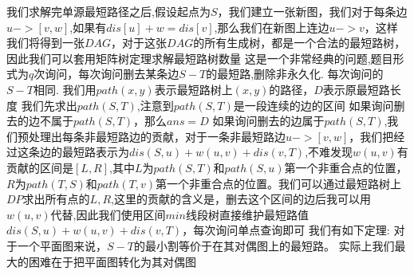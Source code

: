 {}我们求解完单源最短路径之后,假设起点为$ S $，我们建立一张新图，我们对于每条边$ u->[v,w] $,如果有$ dis[u]+w=dis[v] $,那么我们在新图上连边$ u->v $，这样我们将得到一张$ DAG $，对于这张$ DAG $的所有生成树，都是一个合法的最短路树，因此我们可以套用矩阵树定理求解最短路树数量\markdownRendererInterblockSeparator
{}
\markdownRendererSectionEnd \markdownRendererSectionBegin
{}\markdownRendererInterblockSeparator
{}这是一个非常经典的问题,题目形式为$ q $次询问，每次询问删去某条边$ S-T $的最短路,删除非永久化.\markdownRendererParagraphSeparator
{}每次询问的$ S-T $相同.\markdownRendererParagraphSeparator
{}我们用$ path(x,y) $表示最短路树上$ (x,y) $的路径，$ D $表示原最短路长度\markdownRendererParagraphSeparator
{}我们先求出$ path(S,T) $,注意到$ path(S,T) $是一段连续的边的区间\markdownRendererParagraphSeparator
{}如果询问删去的边不属于$ path(S,T) $，那么$ ans=D $\markdownRendererParagraphSeparator
{}如果询问删去的边属于$ path(S,T) $,我们预处理出每条非最短路边的贡献，对于一条非最短路边$ u->[v,w] $，我们把经过这条边的最短路表示为$ dis(S,u)+w(u,v)+dis(v,T) $,不难发现$ w(u,v) $有贡献的区间是$ [L,R] $,其中$ L $为$ path(S,T) $和$ path(S,u) $第一个非重合点的位置，$ R $为$ path(T,S) $和$ path(T,v) $第一个非重合点的位置。我们可以通过最短路树上$ DP $求出所有点的$ L,R $,这里的贡献的含义是，删去这个区间的边后我可以用$ w(u,v) $代替,因此我们使用区间$ min $线段树直接维护最短路值$ dis(S,u)+w(u,v)+dis(v,T) $，每次询问单点查询即可\markdownRendererInterblockSeparator
{}\markdownRendererInterblockSeparator
{}
\markdownRendererSectionEnd \markdownRendererSectionBegin
{}\markdownRendererInterblockSeparator
{}我们有如下定理:\markdownRendererParagraphSeparator
{}对于一个平面图来说，$ S-T $的最小割等价于在其对偶图上的最短路。\markdownRendererParagraphSeparator
{}实际上我们最大的困难在于把平面图转化为其对偶图\markdownRendererInterblockSeparator
{}
\markdownRendererSectionEnd \markdownRendererSectionBegin
{}\markdownRendererInterblockSeparator
